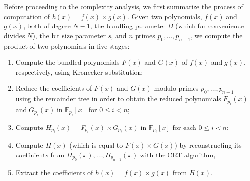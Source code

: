 \documentclass{mcom-l}
\theoremstyle{definition}
\begin{document}
Before proceeding to the complexity analysis, we first summarize the
process of computation of $h(x) = f(x) \times g(x)$. Given two
polynomials, $f(x)$ and $g(x)$, both of degree $N - 1$, the bundling
parameter $B$ (which for convenience divides $N$), the bit size
parameter $s$, and $n$ primes $p_0, \ldots, p_{n-1}$, we compute the
product of two polynomials in five stages:
\begin{enumerate}
  \item Compute the bundled polynomials $F(x)$ and $G(x)$ of $f(x)$
    and $g(x)$, respectively, using Kronecker substitution;

  \item Reduce the coefficients of $F(x)$ and $G(x)$ modulo primes
    $p_0, \ldots, p_{n-1}$ using the remainder tree \cite{borodin} in
    order to obtain the reduced polynomials $F_{p_i}(x)$ and
    $G_{p_i}(x)$ in $\mathbb F_{p_i}[x]$ for $0 \leq i < n$;

  \item Compute $H_{p_i}(x) = F_{p_i}(x) \times G_{p_i}(x)$ in
    $\mathbb F_{p_i}[x]$ for each $0 \leq i < n$;

  \item Compute $H(x)$ (which is equal to $F(x) \times G(x)$) by
    reconstructing its coefficients from $H_{p_0}(x), \ldots,
    H_{p_{n-1}}(x)$ with the CRT algorithm;

  \item Extract the coefficients of $h(x) = f(x) \times g(x)$ from
    $H(x)$.
\end{enumerate}
\end{document}
